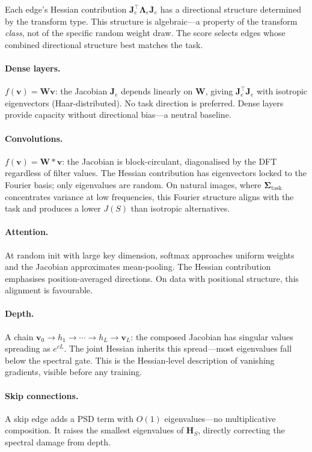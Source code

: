 \documentclass[11pt, a4paper]{article}
\begin{document}
Each edge's Hessian contribution $\bm{J}_e^\top\bm{\Lambda}_e\bm{J}_e$ has a directional structure determined by the transform type.
This structure is algebraic---a property of the transform \emph{class}, not of the specific random weight draw.
The score selects edges whose combined directional structure best matches the task.

\paragraph{Dense layers.}
$f(\bm{v}) = \bm{W}\bm{v}$: the Jacobian $\bm{J}_e$ depends linearly on $\bm{W}$, giving $\bm{J}_e^\top\bm{J}_e$ with isotropic eigenvectors (Haar-distributed).
No task direction is preferred.
Dense layers provide capacity without directional bias---a neutral baseline.

\paragraph{Convolutions.}
$f(\bm{v}) = \bm{W}*\bm{v}$: the Jacobian is block-circulant, diagonalised by the DFT regardless of filter values.
The Hessian contribution has eigenvectors locked to the Fourier basis; only eigenvalues are random.
On natural images, where $\bm{\Sigma}_{\mathrm{task}}$ concentrates variance at low frequencies, this Fourier structure aligns with the task and produces a lower $J(S)$ than isotropic alternatives.

\paragraph{Attention.}
At random init with large key dimension, softmax approaches uniform weights and the Jacobian approximates mean-pooling.
The Hessian contribution emphasises position-averaged directions.
On data with positional structure, this alignment is favourable.

\paragraph{Depth.}
A chain $\bm{v}_0 \to h_1 \to \cdots \to h_L \to \bm{v}_L$: the composed Jacobian has singular values spreading as $e^{cL}$.
The joint Hessian inherits this spread---most eigenvalues fall below the spectral gate.
This is the Hessian-level description of vanishing gradients, visible before any training.

\paragraph{Skip connections.}
A skip edge adds a PSD term with $O(1)$ eigenvalues---no multiplicative composition.
It raises the smallest eigenvalues of $\bm{H}_S$, directly correcting the spectral damage from depth.
\end{document}
